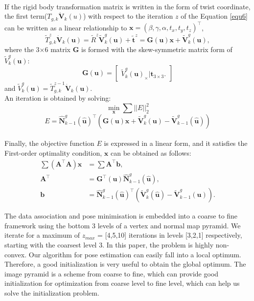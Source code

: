 \documentclass[a4paper,12pt]{article}
\begin{document}
\\If the rigid body transformation matrix is written in the form of twist coordinate, the first term($T_{g,k}\mathbf{\dot{V}}_k(u)$) with respect to the iteration $z$ of the Equation \ref{equ6} can be written as a linear relationship to $\mathbf{x}=(\beta,\gamma,\alpha,t_x,t_y,t_z)^\top$,
\begin{equation}
	\tilde{T}_{g,k}^z\mathbf{\dot{V}}_k(\mathbf{u}) =\tilde{R}^z\mathbf{\tilde{V}}_k^g(\mathbf{u})+\tilde{\mathbf{t}}^z=\mathbf{G(u)x}+\mathbf{\tilde{V}}_k^g(\mathbf{u}),
	\label{equ8}
\end{equation} 
where the 3×6 matrix $\mathbf{G}$ is formed with the skew-symmetric matrix form of $\tilde{V}_{k}^{g}(\mathbf{u})$:
\begin{equation}
	\mathbf{G(u)} =
	\begin{bmatrix}
		\tilde{V}_{k}^{g}(\mathbf{u})_\times | \mathbf{t}_{3\times3}.
	\end{bmatrix}
	\label{equ9}
\end{equation}
and $\tilde{V}_{k}^{g}(\mathbf{u})=\tilde{T}_{g,k}^{z-1}\mathbf{\dot{V}}_k(\mathbf{u})$.
\\An iteration is obtained by solving:
\begin{equation}
	\min_{\mathbf{x}}\sum||E||_2^2
	\label{equ10}
\end{equation} 
\begin{equation}
	E=\mathbf{\hat{N}}_{k-1}^g(\hat{\mathbf{u}})^\top(\mathbf{G(u)x}+\mathbf{\tilde{V}}_k^g(\mathbf{u})-\mathbf{\tilde{V}}_{k-1}^g(\mathbf{\hat{u}}))
	\label{equ11}
\end{equation}
\\Finally, the objective function $E$ is expressed in a linear form, and it satisfies the First-order optimality condition, $\mathbf{x}$ can be obtained as follows:
\begin{align}
	\sum\mathbf{(A^\top A)x}&=\sum\mathbf{A^\top b},\\
	\mathbf{A^\top}&=\mathbf{G^\top(u)}\mathbf{\hat{N}}_{k-1}^g(\mathbf{\hat{u}}),\\
	\mathbf{b}&=\mathbf{\hat{N}}_{k-1}^g(\mathbf{\hat{u}})^\top(\mathbf{\tilde{V}}_k^g(\mathbf{\hat{u}})-\mathbf{\tilde{V}}_{k-1}^g(\mathbf{u})).
\end{align}

The data association and pose minimisation is embedded into a coarse to fine framework using the bottom 3 levels of a vertex and normal map pyramid. 
We iterate for a maximum of $z_{max}$ = [4,5,10] iterations in levels [3,2,1] respectively, starting with the coarsest level 3.
In this paper, the problem is highly non-convex. Our algorithm for pose estimation can easily fall into a local optimum. 
Therefore, a good initialization is very useful to obtain the global optimum.
The image pyramid is a scheme from coarse to fine, which can provide good initialization for optimization from coarse level to fine level, which can help us solve the initialization problem.
\end{document}
